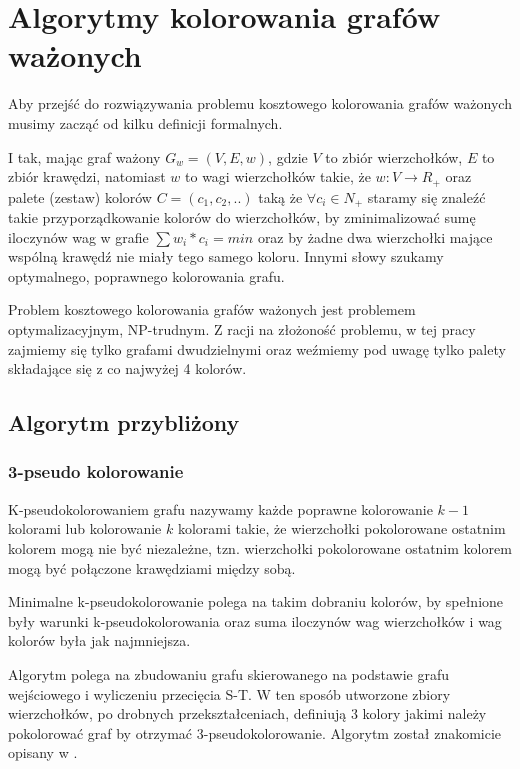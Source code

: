 \documentclass{article}
\begin{document}
\section{Algorytmy kolorowania grafów ważonych}

Aby przejść do rozwiązywania problemu kosztowego kolorowania grafów ważonych musimy zacząć od kilku definicji formalnych. 


I tak, mając graf ważony $G_w = (V,E,w)$, gdzie $V$ to zbiór wierzchołków, $E$ to zbiór krawędzi, natomiast $w$ to wagi wierzchołków takie, że  $w:V \rightarrow R_+$ oraz palete (zestaw) kolorów $C = (c_1, c_2, ..)$ taką że $\forall c_i \in N_+$ staramy się znaleźć takie przyporządkowanie kolorów do wierzchołków, by zminimalizować sumę iloczynów wag w grafie $\sum w_i * c_i = min$ oraz by żadne dwa wierzchołki mające wspólną krawędź nie miały tego samego koloru. Innymi słowy szukamy optymalnego, poprawnego kolorowania grafu.

Problem kosztowego kolorowania grafów ważonych jest problemem optymalizacyjnym, NP-trudnym. Z racji na złożoność problemu, w tej pracy zajmiemy się tylko grafami dwudzielnymi oraz weźmiemy pod uwagę tylko palety składające się z co najwyżej 4 kolorów.

\subsection{Algorytm przybliżony}

\subsubsection*{3-pseudo kolorowanie}

K-pseudokolorowaniem grafu nazywamy każde poprawne kolorowanie $k-1$ kolorami lub kolorowanie $k$ kolorami takie, że wierzchołki pokolorowane ostatnim kolorem mogą nie być niezależne, tzn. wierzchołki pokolorowane ostatnim kolorem mogą być połączone krawędziami między sobą. 

Minimalne k-pseudokolorowanie polega na takim dobraniu kolorów, by spełnione były warunki k-pseudokolorowania oraz suma iloczynów wag wierzchołków i wag kolorów była jak najmniejsza.

Algorytm polega na zbudowaniu grafu skierowanego na podstawie grafu wejściowego i wyliczeniu przecięcia S-T. W ten sposób utworzone zbiory wierzchołków, po drobnych przekształceniach, definiują 3 kolory jakimi należy pokolorować graf by otrzymać 3-pseudokolorowanie. Algorytm został znakomicie opisany w \cite{kubale-pikies19}.
\end{document}

